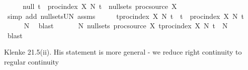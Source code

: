 \begin{isabellebody}
\ \ \isamarkupfalse%
\ \isamarkupfalse%
\ null{\isacharcolon}{\kern0pt}\ {\isachardoublequoteopen}{\isacharparenleft}{\kern0pt}{\isasymUnion}t\ {\isasymin}\ proc{\isacharunderscore}{\kern0pt}index\ X{\isachardot}{\kern0pt}\ N\ t{\isacharparenright}{\kern0pt}\ {\isasymin}\ null{\isacharunderscore}{\kern0pt}sets\ {\isacharparenleft}{\kern0pt}proc{\isacharunderscore}{\kern0pt}source\ X{\isacharparenright}{\kern0pt}{\isachardoublequoteclose}\isanewline
\ \ \ \ \isamarkupfalse%
\ {\isacharparenleft}{\kern0pt}simp\ add{\isacharcolon}{\kern0pt}\ null{\isacharunderscore}{\kern0pt}sets{\isacharunderscore}{\kern0pt}UN{\isacharprime}{\kern0pt}\ assms{\isacharparenleft}{\kern0pt}{}{\isacharparenright}{\kern0pt}{\isacharparenright}{\kern0pt}\isanewline
\ \ \isamarkupfalse%
\ \isamarkupfalse%
\ {\isachardoublequoteopen}{\isasymforall}t{\isasymin}proc{\isacharunderscore}{\kern0pt}index\ X{\isachardot}{\kern0pt}\ {\isacharquery}{\kern0pt}N\ t\ {\isasymsubseteq}\ {\isacharparenleft}{\kern0pt}{\isasymUnion}t\ {\isasymin}\ proc{\isacharunderscore}{\kern0pt}index\ X{\isachardot}{\kern0pt}\ N\ t{\isacharparenright}{\kern0pt}{\isachardoublequoteclose}\isanewline
\ \ \ \ \isamarkupfalse%
\ N\ \isamarkupfalse%
\ blast\ \isanewline
\ \ \isamarkupfalse%
\ \isamarkupfalse%
\ {\isachardoublequoteopen}{\isasymexists}N{\isasymin}\ null{\isacharunderscore}{\kern0pt}sets\ {\isacharparenleft}{\kern0pt}proc{\isacharunderscore}{\kern0pt}source\ X{\isacharparenright}{\kern0pt}{\isachardot}{\kern0pt}\ {\isacharparenleft}{\kern0pt}{\isasymforall}t{\isasymin}proc{\isacharunderscore}{\kern0pt}index\ X{\isachardot}{\kern0pt}\ {\isacharquery}{\kern0pt}N\ t\ {\isasymsubseteq}\ N{\isacharparenright}{\kern0pt}{\isachardoublequoteclose}\isanewline
\ \ \ \ \isamarkupfalse%
\ blast\isanewline
{}\isamarkupfalse%
%
\endisatagproof
{\isafoldproof}%
%
\isadelimproof
%
\endisadelimproof
%
\begin{isamarkuptext}%
Klenke 21.5(ii). His statement is more general - we reduce right continuity to regular continuity%
\end{isamarkuptext}\isamarkuptrue%
%
\end{isabellebody}
